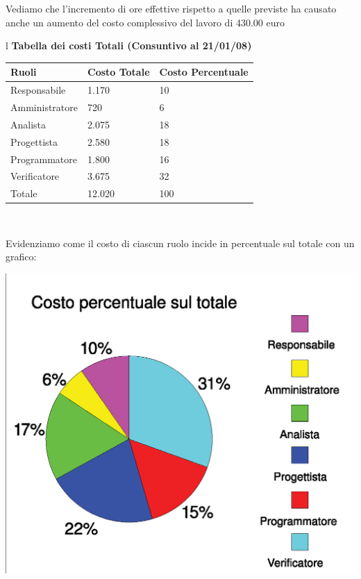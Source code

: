 \documentclass[11pt,titlepage,a4paper]{report}
\begin{document}
Vediamo che l'incremento di ore effettive rispetto a quelle previste ha causato
anche un aumento del costo complessivo del lavoro di 430.00 euro

\begin{table}[hbtp]
\large{
\begin{tabular}{l}
\Large{\textbf{\textsf{Tabella dei costi Totali (Consuntivo al 21/01/08)}}} \\
\begin{tabular}{||p{4cm}||p{3cm}||p{3cm}||}
\hline
\textbf{Ruoli} & \textbf{Costo Totale}& \textbf{Costo Percentuale}\\
\hline
{Responsabile}&1.170&10\\ 
\hline 
{Amministratore} &720&6\\ 
\hline
{Analista} &2.075&18 \\
\hline
{Progettista} &2.580&18 \\
\hline
{Programmatore} &1.800&16\\
\hline
{Verificatore} &3.675&32 \\
\hline
{Totale} &12.020&100 \\
\hline
\end{tabular} \\
\end{tabular}
}
\end{table}


Evidenziamo come il costo di ciascun ruolo incide in percentuale
sul totale con un grafico:
\begin{center}
\includegraphics [width=1\textwidth] {costiPercentuali.eps}
\end{center}
\end{document}
